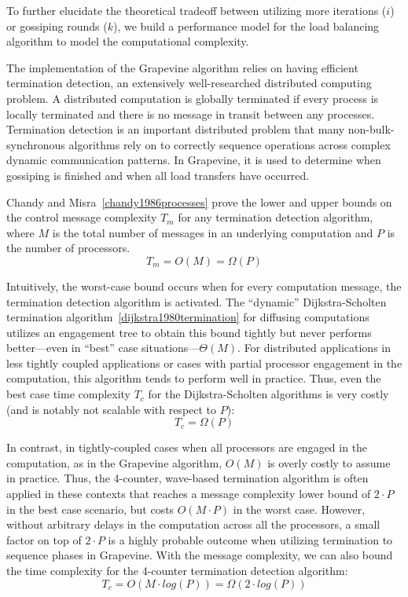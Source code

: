 To further elucidate the theoretical tradeoff between utilizing more iterations
($i$) or gossiping rounds ($k$), we build a performance model for the load
balancing algorithm to model the computational complexity.

The implementation of the \textsf{Grapevine} algorithm relies on having
efficient termination detection, an extensively well-researched distributed
computing problem. A distributed computation is globally terminated if every
process is locally terminated and there is no message in transit between any
processes. Termination detection is an important distributed problem that many
non-bulk-synchronous algorithms rely on to correctly sequence operations across
complex dynamic communication patterns. In \textsf{Grapevine}, it is used to
determine when gossiping is finished and when all load transfers have occurred.

Chandy and Misra~\ref{chandy1986processes} prove the lower and upper bounds on
the control message complexity $T_m$ for any termination detection algorithm,
where $M$ is the total number of messages in an underlying computation and $P$
is the number of processors.
\[
T_m = O(M) = \Omega(P)
\]

Intuitively, the worst-case bound occurs when for every computation message, the
termination detection algorithm is activated. The ``dynamic'' Dijkstra-Scholten
termination algorithm~\ref{dijkstra1980termination} for diffusing computations
utilizes an engagement tree to obtain this bound tightly but never performs
better---even in ``best'' case situations---$\Theta(M)$. For distributed
applications in less tightly coupled applications or cases with partial
processor engagement in the computation, this algorithm tends to perform well in
practice. Thus, even the best case time complexity $T_c$ for the
Dijkstra-Scholten algorithms is very costly (and is notably not scalable with
respect to $P$):
\[
T_c = \Omega(P)
\]

In contrast, in tightly-coupled cases when all processors are engaged in the
computation, as in the \textsf{Grapevine} algorithm, $O(M)$ is overly costly to
assume in practice. Thus, the 4-counter, wave-based termination algorithm is
often applied in these contexts that reaches a message complexity lower bound of
$2\cdot P$ in the best case scenario, but costs $O(M\cdot P)$ in the worst
case. However, without arbitrary delays in the computation across all the
processors, a small factor on top of $2\cdot P$ is a highly probable outcome
when utilizing termination to sequence phases in \textsf{Grapevine}. With the
message complexity, we can also bound the time complexity for the 4-counter
termination detection algorithm:
\[
T_c = O(M\cdot log(P)) = \Omega(2\cdot log(P))
\]

